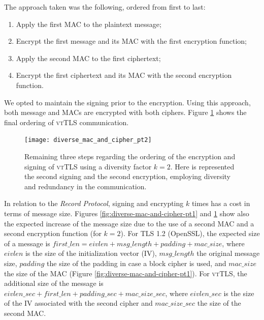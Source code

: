 \documentclass{sig-alternate-05-2015}
\begin{document}
The approach taken was the following, ordered from first to last:
\begin{enumerate}
\item{Apply the first MAC to the plaintext message;}
\item{Encrypt the first message and its MAC with the first encryption function;}
\item{Apply the second MAC to the first ciphertext;}
\item{Encrypt the first ciphertext and its MAC with the second encryption function.}
\end{enumerate}
We opted to maintain the signing prior to the encryption. Using this approach, both message and MACs are encrypted with both ciphers. 
Figure \ref{fig:diverse-mac-and-cipher-pt2} shows the final ordering of \textsc{vtTLS} communication.

\begin{figure}[t]
\texttt{[image: diverse\_mac\_and\_cipher\_pt2]}
\centering
\caption{Remaining three steps regarding the ordering of the encryption and signing of \textsc{vtTLS} using a diversity factor $k = 2$. Here is represented the second signing and the second encryption, employing diversity and redundancy in the communication.}
\label{fig:diverse-mac-and-cipher-pt2}
\end{figure}



In relation to the \textit{Record Protocol},
signing and encrypting $k$ times has a cost in terms of message size.
Figures \ref{fig:diverse-mac-and-cipher-pt1} and \ref{fig:diverse-mac-and-cipher-pt2} show also the expected
increase of the message size due to the use of a second MAC and a second encryption function (for $k=2$). 
For TLS 1.2 (OpenSSL), the expected size of a message is $first\_len=eivlen+msg\_length+padding+mac\_size$, where $eivlen$ is the size of the initialization vector (IV), $msg\_length$ the original message size, $padding$ the size of the padding in case a block cipher is used, and $mac\_size$ the size of the MAC (Figure \ref{fig:diverse-mac-and-cipher-pt1}). 
For \textsc{vtTLS}, the additional size of the message is $eivlen\_sec+first\_len+padding\_sec+mac\_size\_sec$, where $eivlen\_sec$ is the size of the IV associated with the second cipher and $mac\_size\_sec$ the size of the second MAC.
\end{document}
